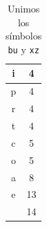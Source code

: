 \documentclass[letterpaper,11pt]{article}
\begin{document}
\begin{enumerate}
\begin{table}[H]
{\begin{tabular}{|c|c|}
            \hline
            i & 4 \\
            \hline
            p & 4 \\
            \hline
            r & 4 \\
            \hline
            t & 4 \\
            \hline
            c & 5 \\
            \hline
            o & 5 \\
            \hline
            a & 8 \\
            \hline
            e & 13 \\
            \hline
            \texttt{\char32} & 14 \\
            \hline
        \end{tabular}
        \caption{Unimos los símbolos \texttt{bu} y \texttt{xz}}
        }
    \end{table}


\end{enumerate}
\end{document}
